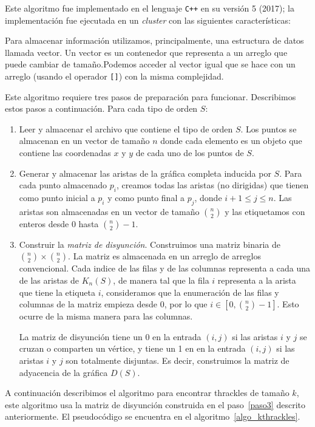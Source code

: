   Este algoritmo fue implementado en el lenguaje \texttt{C++} en su versión 5 (2017); la
  implementación fue ejecutada en un \emph{cluster} con las siguientes características:

  Para almacenar información utilizamos, principalmente, una estructura de datos llamada vector.
  Un vector es un contenedor que representa a un arreglo que puede cambiar de tamaño.Podemos
  acceder al vector igual que se hace con un arreglo (usando el operador \texttt{[]}) con la misma
  complejidad.

  Este algoritmo requiere tres pasos de preparación para funcionar. Describimos estos pasos a continuación. Para cada tipo de orden $S$:
  \begin{enumerate}
    \item Leer y almacenar el archivo que contiene el tipo de orden $S$.
    Los puntos se almacenan en un vector de tamaño $n$ donde cada elemento es
    un objeto que contiene las coordenadas $x$ y $y$ de cada uno de los puntos
    de $S$.
    \item Generar y almacenar las aristas de la gráfica completa inducida por
    $S$. Para cada punto almacenado $p_i$, creamos todas las aristas (no
    dirigidas) que tienen como punto inicial a $p_i$ y como punto final a $p_j$,
    donde $ i+1 \leq j \leq n$.
    Las aristas son almacenadas en un vector de tamaño $\binom{n}{2}$ y las
    etiquetamos con enteros desde $0$ hasta $\binom{n}{2}-1$.
    \item \label{paso3}Construir la \emph{matriz de disyunción}.
    Construimos una matriz binaria de $\binom{n}{2}\times \binom{n}{2}$. La
    matriz es almacenada en un arreglo de arreglos convencional. Cada
    indice de las filas y de las columnas representa a cada una de las aristas
    de $K_n(S)$, de manera tal que la fila $i$ representa a la arista que tiene
    la etiqueta $i$, consideramos que la enumeración de las filas y columnas de
    la matriz empieza desde $0$, por lo que $i \in [0,\binom{n}{2}-1]$. Esto ocurre de la misma
    manera para las columnas.

    La matriz de disyunción tiene un 0 en la entrada $(i,j)$ si las aristas $i$ y $j$ se cruzan o
    comparten un vértice, y tiene un 1 en en la entrada $(i,j)$ si las aristas $i$ y $j$ son
    totalmente disjuntas. Es decir, construimos la
    matriz de adyacencia de la gráfica $D(S)$.
  \end{enumerate}

  A continuación describimos el algoritmo para encontrar thrackles
  de tamaño $k$, este algoritmo usa la matriz de disyunción construida en el
  paso~\ref{paso3} descrito anteriormente. El pseudocódigo se encuentra en el
  algoritmo~\ref{algo_kthrackles}.

